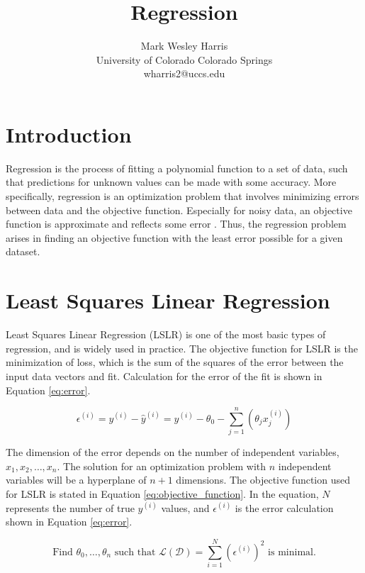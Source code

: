 \documentclass[letterpaper]{article} %
\title{Regression}
\author{Mark Wesley Harris\\ %
University of Colorado Colorado Springs\\
wharris2@uccs.edu %
}
\begin{document}
\maketitle

\section{Introduction}
Regression is the process of fitting a polynomial function
to a set of data, such that predictions for unknown values can be made with some accuracy.
More specifically, regression is an optimization problem that involves minimizing errors between data
and the objective function.
Especially for noisy data,
an objective function is approximate and reflects some error
\cite{mathematical_programming}.
Thus, the regression problem arises in finding an objective function
with the least error possible for a given dataset.

\section{Least Squares Linear Regression}
Least Squares Linear Regression (LSLR) is one of the most
basic types of regression, and is widely used in practice.
The objective function for LSLR is the
minimization of loss, which is the sum
of the squares of the error between the input data vectors
and fit.
Calculation for the error of the fit is shown in Equation \ref{eq:error}.

\begin{equation}
\label{eq:error}
\epsilon^{(i)} = y^{(i)} - \hat{y}^{(i)} = y^{(i)} - \theta_0 - \sum_{j=1}^{n}(\theta_jx^{(i)}_j)
\end{equation}

The dimension of the error depends on the number of independent variables, $x_1,x_2,\dots,x_n$.
The solution for an optimization problem with $n$
independent variables will be a hyperplane of $n + 1$ dimensions.
The objective function used for LSLR is stated in Equation \ref{eq:objective_function}.
In the equation, $N$ represents the number
of true $y^{(i)}$ values, and $\epsilon^{(i)}$ is the error calculation
shown in Equation \ref{eq:error}.

\begin{equation}
\label{eq:objective_function}
\text{Find } \theta_{0},\dots,\theta_{n} \text{ such that } \mathcal{L}(\mathcal{D}) = \sum_{i=1}^{N} (\epsilon^{(i)})^2 \text{ is minimal.}
\end{equation}
\end{document}
